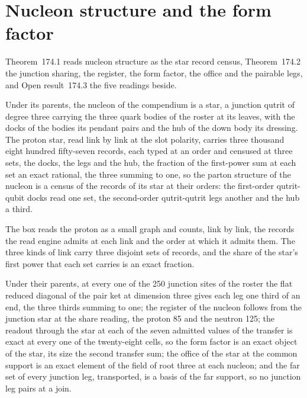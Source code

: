 \section{Nucleon structure and the form factor}\label{mod:VII-3-nucleon-structure-and-the-form-factor}
\label{narr:open:7-3}Theorem~174.1 reads nucleon structure as the star record census, Theorem~174.2 the junction sharing, the register, the form factor, the office and the pairable legs, and Open result~174.3 the five readings beside.
\begin{chconditional}\label{box:VII-3-nucleon-structure-and-the-form-factor:1}
Under its parents, the nucleon of the compendium is a star, a junction qutrit of degree three carrying the three quark bodies of the roster at its leaves, with the docks of the bodies its pendant pairs and the hub of the down body its dressing. The proton star, read link by link at the slot polarity, carries three thousand eight hundred fifty-seven records, each typed at an order and censused at three sets, the docks, the legs and the hub, the fraction of the first-power sum at each set an exact rational, the three summing to one, so the parton structure of the nucleon is a census of the records of its star at their orders: the first-order qutrit-qubit docks read one set, the second-order qutrit-qutrit legs another and the hub a third.
\end{chconditional}
The box reads the proton as a small graph and counts, link by link, the records the read engine admits at each link and the order at which it admits them. The three kinds of link carry three disjoint sets of records, and the share of the star's first power that each set carries is an exact fraction.
\begin{chconditional}\label{box:VII-3-nucleon-structure-and-the-form-factor:2}
Under their parents, at every one of the 250 junction sites of the roster the flat reduced diagonal of the pair ket at dimension three gives each leg one third of an end, the three thirds summing to one; the register of the nucleon follows from the junction star at the share reading, the proton 85 and the neutron 125; the readout through the star at each of the seven admitted values of the transfer is exact at every one of the twenty-eight cells, so the form factor is an exact object of the star, its size the second transfer sum; the office of the star at the common support is an exact element of the field of root three at each nucleon; and the far set of every junction leg, transported, is a basis of the far support, so no junction leg pairs at a join.
\end{chconditional}
